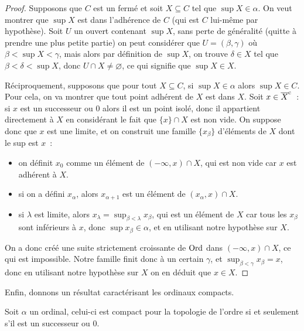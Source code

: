 \begin{proof}
  Supposons que $C$ est un fermé et soit $X\subseteq C$ tel que
  $\sup X \in \alpha$. On veut montrer que $\sup X$ est dans l'adhérence de $C$
  (qui est $C$ lui-même par hypothèse). Soit $U$ un ouvert contenant
  $\sup X$, sans perte de généralité (quitte à prendre une plus petite partie)
  on peut considérer que $U = (\beta, \gamma)$ où $\beta < \sup X < \gamma$,
  mais alors par définition de $\sup X$, on trouve $\delta \in X$ tel que
  $\beta < \delta < \sup X$, donc $U \cap X \neq\varnothing$, ce qui signifie
  que $\sup X \in X$.

  Réciproquement, supposons que pour tout $X\subseteq C$, si $\sup X \in \alpha$
  alors $\sup X \in C$. Pour cela, on va montrer que tout point adhérent de
  $X$ est dans $X$. Soit $x \in \overline{X}^{\mathrm c}$~: si $x$ est un successeur ou $0$
  alors il est un point isolé, donc il appartient directement à $X$ en
  considérant le fait que $\{x\}\cap X$ est non vide. On suppose donc que
  $x$ est une limite, et on construit une famille $\{x_\beta\}$ d'éléments de
  $X$ dont le sup est $x$~:
  \begin{itemize}
  \item on définit $x_0$ comme un élément de $(-\infty, x)\cap X$, qui est non
    vide car $x$ est adhérent à $X$.
  \item si on a défini $x_\alpha$, alors $x_{\alpha + 1}$ est un élément de
    $(x_\alpha,x)\cap X$.
  \item si $\lambda$ est limite, alors
    $x_{\lambda}=\sup_{\beta < \lambda}x_\beta$, qui est un élément de $X$ car
    tous les $x_\beta$ sont inférieurs à $x$, donc $\sup x_\beta\in \alpha$,
    et en utilisant notre hypothèse sur $X$.
  \end{itemize}
  On a donc créé une suite strictement croissante de $\operatorname{Ord}$ dans
  $(-\infty,x)\cap X$, ce qui est impossible. Notre famille finit donc à un
  certain $\gamma$, et $\sup_{\beta < \gamma} x_\beta = x$, donc en utilisant
  notre hypothèse sur $X$ on en déduit que $x\in X$.
\end{proof}

Enfin, donnons un résultat caractérisant les ordinaux compacts.

\begin{proposition}\label{prop.compac.succ}
  Soit $\alpha$ un ordinal, celui-ci est compact pour la topologie de l'ordre si
  et seulement s'il est un successeur ou $0$.
\end{proposition}

